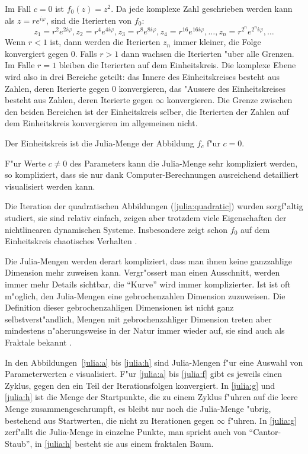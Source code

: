 \begin{refsection}
\begin{beispiel}
Im Fall $c=0$ ist $f_0(z)=z^2$. Da jede komplexe Zahl geschrieben werden
kann als $z=re^{i\varphi}$, sind die Iterierten von $f_0$:
\[
z_1=r^2e^{2i\varphi},
z_2=r^4e^{4i\varphi},
z_3=r^8e^{8i\varphi},
z_4=r^{16}e^{16i\varphi},\dots,
z_n=r^{2^n}e^{2^ni\varphi},\dots
\]
Wenn $r < 1$ ist, dann werden die Iterierten $z_n$ immer kleiner, die
Folge konvergiert gegen $0$.
Falls $r>1$ dann wachsen die Iterierten "uber alle Grenzen.
Im Falle $r=1$ bleiben die Iterierten auf dem Einheitskreis.
Die komplexe Ebene wird also in drei Bereiche geteilt: das
Innere des Einheitskreises besteht aus Zahlen, deren Iterierte gegen
0 konvergieren, das "Aussere des Einheitskreises besteht aus Zahlen,
deren Iterierte gegen $\infty$ konvergieren.
Die Grenze zwischen den beiden Bereichen ist der Einheitskreis selber,
die Iterierten der Zahlen auf dem Einheitskreis konvergieren im
allgemeinen nicht.

Der Einheitskreis ist die Julia-Menge der Abbildung $f_c$ f"ur $c=0$.
\end{beispiel}

F"ur Werte $c\ne 0$ des Parameters kann die Julia-Menge sehr kompliziert
werden, so kompliziert, dass sie nur dank Computer-Berechnungen
ausreichend detailliert visualisiert werden kann.

Die Iteration der quadratischen Abbildungen (\ref{julia:quadratic})
wurden sorgf"altig studiert, sie sind relativ einfach, zeigen aber
trotzdem viele Eigenschaften der nichtlinearen dynamischen Systeme.
Insbesondere zeigt schon $f_0$ auf dem Einheitskreis chaotisches
Verhalten \cite{julia:devaney}.

Die Julia-Mengen werden derart kompliziert, dass man ihnen keine ganzzahlige
Dimension mehr zuweisen kann. Vergr"ossert man einen Ausschnitt, werden
immer mehr Details sichtbar, die ``Kurve'' wird immer komplizierter.
Ist ist oft m"oglich, den Julia-Mengen eine gebrochenzahlen Dimension
zuzuweisen.
Die Definition dieser gebrochenzahligen Dimensionen ist nicht ganz
selbstverst"andlich, Mengen mit gebrochenzahliger Dimension treten
aber mindestens n"aherungsweise in der Natur immer wieder auf, sie
sind auch als Fraktale bekannt \cite{julia:falconer}.

In den Abbildungen~\ref{julia:a} bis \ref{julia:h} sind Julia-Mengen
f"ur eine Auswahl von Parameterwerten $c$ visualisiert.
F"ur \ref{julia:a} bis \ref{julia:f} gibt es jeweils einen Zyklus, gegen
den ein Teil der Iterationsfolgen konvergiert.
In \ref{julia:g} und \ref{julia:h} ist die Menge der Startpunkte, die zu einem
Zyklus f"uhren auf die leere Menge zusammengeschrumpft, es bleibt nur
noch die Julia-Menge "ubrig, bestehend aus Startwerten, die nicht zu
Iterationen gegen $\infty$ f"uhren.
In \ref{julia:g} zerf"allt die Julia-Menge in einzelne Punkte, 
man spricht auch von ``Cantor-Staub'',
in \ref{julia:h} besteht sie aus einem fraktalen Baum.


\end{refsection}
